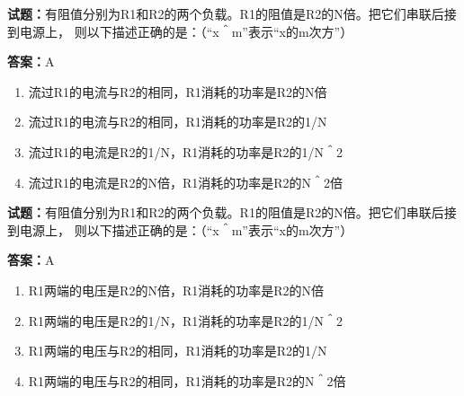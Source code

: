 \documentclass{ctexbook}
\begin{document}




\vspace{1em}

\textbf{试题：}有阻值分别为R1和R2的两个负载。R1的阻值是R2的N倍。把它们串联后接到电源上，
则以下描述正确的是：（“x＾m”表示“x的m次方”） 

\textbf{答案：}A 

\begin{enumerate}[leftmargin=3em]
  \item 流过R1的电流与R2的相同，R1消耗的功率是R2的N倍 

  \item 流过R1的电流与R2的相同，R1消耗的功率是R2的1/N 

  \item 流过R1的电流是R2的1/N，R1消耗的功率是R2的1/N＾2 

  \item 流过R1的电流是R2的N倍，R1消耗的功率是R2的N＾2倍 

\end{enumerate}





\vspace{1em}

\textbf{试题：}有阻值分别为R1和R2的两个负载。R1的阻值是R2的N倍。把它们串联后接到电源上，
则以下描述正确的是：（“x＾m”表示“x的m次方”） 

\textbf{答案：}A 

\begin{enumerate}[leftmargin=3em]
  \item R1两端的电压是R2的N倍，R1消耗的功率是R2的N倍 

  \item R1两端的电压是R2的1/N，R1消耗的功率是R2的1/N＾2 

  \item R1两端的电压与R2的相同，R1消耗的功率是R2的1/N 

  \item R1两端的电压与R2的相同，R1消耗的功率是R2的N＾2倍 

\end{enumerate}





\vspace{1em}
\end{document}
